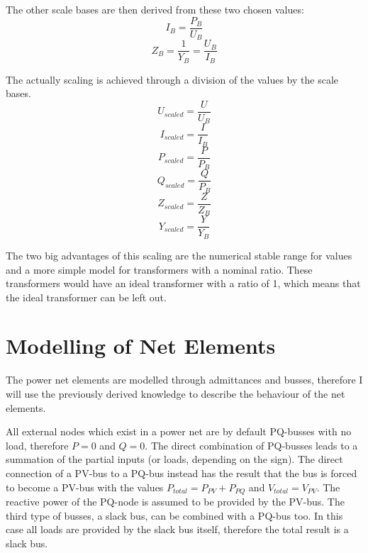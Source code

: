 The other scale bases are then derived from these two chosen values:
\begin{equation}
	I_B = \frac{P_B}{U_B}
\end{equation}
\begin{equation}
	Z_B = \frac{1}{Y_B} = \frac{U_B}{I_B}
\end{equation}

The actually scaling is achieved through a division of the values by the scale bases.
\begin{equation}
	U_{scaled} = \frac{U}{U_B}
\end{equation}
\begin{equation}
	I_{scaled} = \frac{I}{I_B}
\end{equation}
\begin{equation}
	P_{scaled} = \frac{P}{P_B}
\end{equation}
\begin{equation}
	Q_{scaled} = \frac{Q}{P_B}
\end{equation}
\begin{equation}
	Z_{scaled} = \frac{Z}{Z_B}
\end{equation}
\begin{equation}
	Y_{scaled} = \frac{Y}{Y_B}
	\label{eq:scaling_admittance}
\end{equation}

The two big advantages of this scaling are the numerical stable range for values and a more simple model for transformers with a nominal ratio. These transformers would have an ideal transformer with a ratio of 1, which means that the ideal transformer can be left out.

\section{Modelling of Net Elements}
\label{sec:modelling}

The power net elements are modelled through admittances and busses, therefore I will use the previously derived knowledge to describe the behaviour of the net elements.

All external nodes which exist in a power net are by default PQ-busses with no load, therefore $P = 0$ and $Q = 0$. The direct combination of PQ-busses leads to a summation of the partial inputs (or loads, depending on the sign). The direct connection of a PV-bus to a PQ-bus instead has the result that the bus is forced to become a PV-bus with the values $P_{total} = P_{PV} + P_{PQ}$ and $V_{total} = V_{PV}$. The reactive power of the PQ-node is assumed to be provided by the PV-bus. The third type of busses, a slack bus, can be combined with a PQ-bus too. In this case all loads are provided by the slack bus itself, therefore the total result is a slack bus.

